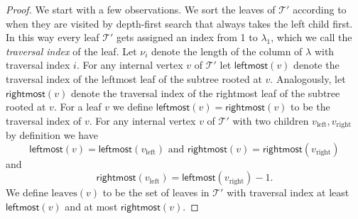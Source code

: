 \documentclass[10pt,a4paper]{article}
\numberwithin{equation}{section}
\theoremstyle{definition}
\newcommand{\CT}{\mathcal{T}}
\newcommand{\la}{\lambda}
\begin{document}
\begin{proof}
We start with a few observations.
We sort the leaves of $\CT'$ according to when they are visited by depth-first search that always takes the left child first. In this way every leaf $\CT'$ gets assigned an index from 1 to $\la_1$, which we call the \emph{traversal index} of the leaf.
Let $\nu_i$ denote the length of the column of $\la$ with traversal index $i$.
For any internal vertex $v$ of $\CT'$ let $\textsf{leftmost}(v)$ denote the traversal index of the leftmost leaf of the subtree rooted at $v$.
Analogously, let $\textsf{rightmost}(v)$ denote the traversal index of the rightmost leaf of the subtree rooted at $v$. For a leaf $v$ we define $\textsf{leftmost}(v)=\textsf{rightmost}(v)$ to be the traversal index of $v$.
For any internal vertex $v$ of $\CT'$ with two children $v_\text{left}, v_\text{right}$ by definition we have
\begin{equation}\label{eq:leftmostv}
\textsf{leftmost}(v)=\textsf{leftmost}(v_\text{left}) \text{ and } \textsf{rightmost}(v)=\textsf{rightmost}(v_\text{right})
\end{equation}
and
\begin{equation}\label{eq:rightmostleft}
\textsf{rightmost}(v_\text{left})=\textsf{leftmost}(v_\text{right})-1.
\end{equation}
We define $\text{leaves}(v)$ to be the set of leaves in $\CT'$ with traversal index at least $\textsf{leftmost}(v)$ and at most $\textsf{rightmost}(v)$.


\end{proof}
\end{document}
